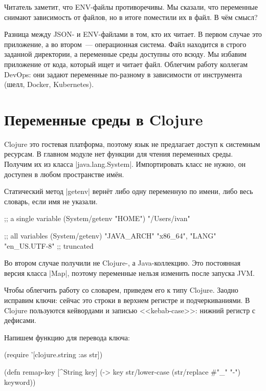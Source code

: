 Читатель заметит, что ENV-файлы противоречивы. Мы сказали, что переменные
снимают зависимость от файлов, но в итоге поместили их в файл. В ч\"{е}м смысл?


Разница между JSON- и ENV-файлами в том, кто их читает. В первом случае это
приложение, а во втором~--- операционная система. Файл находится в строго
заданной директории, а переменные среды доступны ото всюду. Мы избавим
приложение от кода, который ищет и читает файл. Облегчим работу коллегам DevOps:
они задают переменные по-разному в зависимости от инструмента (шелл, Docker,
Kubernetes).

\section{Переменные среды в Clojure}


Clojure это гостевая платформа, поэтому язык не предлагает доступ к системным
ресурсам. В главном модуле нет функции для чтения переменных среды. Получим их
из класса \spverb|java.lang.System|. Импортировать класс не нужно, он доступен в
любом пространстве им\"{е}н.

Статический метод \spverb|getenv| верн\"{е}т либо одну переменную по имени, либо
весь словарь, если имя не указали.

\begin{english}
  \begin{clojure}
;; a single variable
(System/getenv "HOME")
"/Users/ivan"

;; all variables
(System/getenv)
{"JAVA_ARCH" "x86_64", "LANG" "en_US.UTF-8"} ;; truncated
  \end{clojure}
\end{english}

Во втором случае получили не Clojure-, а Java-коллекцию. Это постоянная версия
класса \spverb|Map|, поэтому переменные нельзя изменить после запуска JVM.

Чтобы облегчить работу со словарем, приведем его к типу Clojure. Заодно исправим
ключи: сейчас это строки в верхнем регистре и подчеркиваниями. В Clojure
пользуются кейвордами и записью <<kebab-case>>: нижний регистр с дефисами.


Напишем функцию для перевода ключа:

\begin{english}
  \begin{clojure}
(require '[clojure.string :as str])

(defn remap-key [^String key]
  (-> key
      str/lower-case
      (str/replace #"_" "-")
      keyword))
  \end{clojure}
\end{english}

